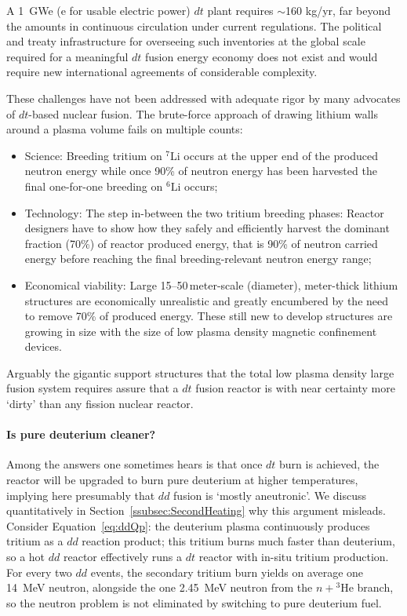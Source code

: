 \documentclass[particles,article,accept,pdftex,moreauthors]{Definitions/mdpi}
\begin{document}
A 1~GWe (e for usable electric power) $dt$ plant requires $\sim$160 kg/yr, far beyond the amounts in continuous circulation under current regulations. The political and treaty infrastructure for overseeing such inventories at the global scale required for a meaningful $dt$ fusion energy economy does not exist and would require new international agreements of considerable complexity.

These challenges have not been addressed with adequate rigor by many advocates of $dt$-based nuclear fusion. The brute-force approach of drawing lithium walls around a plasma volume fails on multiple counts:
\begin{itemize}
\item Science: Breeding tritium on ${}^7\mathrm{Li}$ occurs at the upper end of the produced neutron energy while once 90\% of neutron energy has been harvested the final one-for-one breeding on ${}^6\mathrm{Li}$ occurs;
\item Technology: The step in-between the two tritium breeding phases: Reactor designers have to show how they safely and efficiently harvest the dominant fraction (70\%) of reactor produced energy, that is 90\% of neutron carried energy before reaching the final breeding-relevant neutron energy range; 
\item Economical viability: Large 15--50\,meter-scale (diameter), meter-thick lithium structures are economically unrealistic and greatly encumbered by the need to remove 70\% of produced energy. These still new to develop structures are growing in size with the size of low plasma density magnetic confinement devices. 
\end{itemize}

Arguably the gigantic support structures that the total low plasma density large fusion system requires assure that a $dt$ fusion reactor is with near certainty more `dirty' than any fission nuclear reactor.

\paragraph*{\bf Is pure deuterium cleaner?}
Among the answers one sometimes hears is that once $dt$ burn is achieved, the reactor will be upgraded to burn pure deuterium at higher temperatures, implying here presumably that $dd$ fusion is `mostly aneutronic'. We discuss quantitatively in Section~\ref{ssubsec:SecondHeating} why this argument misleads. Consider Equation~\eqref{eq:ddQp}: the deuterium plasma continuously produces tritium as a $dd$ reaction product; this tritium burns much faster than deuterium, so a hot $dd$ reactor effectively runs a $dt$ reactor with in-situ tritium production. For every two $dd$ events, the secondary tritium burn yields on average one 14~MeV neutron, alongside the one 2.45~MeV neutron from the $n+{}^3\mathrm{He}$ branch, so the neutron problem is not eliminated by switching to pure deuterium fuel.
\end{document}
